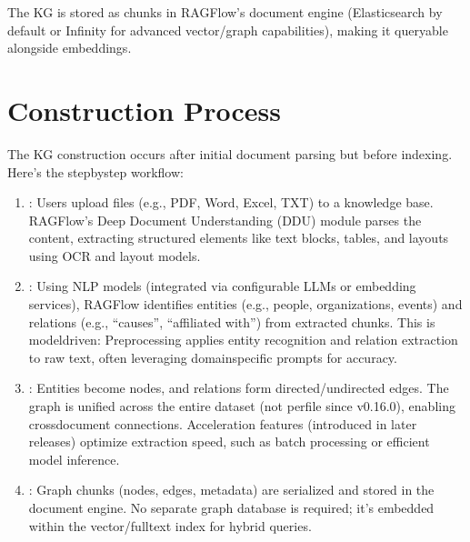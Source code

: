 \documentclass[letterpaper,10pt,english]{sphinxmanual}
\begin{document}
\sphinxAtStartPar
The KG is stored as chunks in RAGFlow’s document engine (Elasticsearch by default or Infinity for advanced vector/graph capabilities), making it queryable alongside embeddings.


\section{Construction Process}
\label{\detokenize{graph:construction-process}}
\sphinxAtStartPar
The KG construction occurs after initial document parsing but before indexing. Here’s the step\sphinxhyphen{}by\sphinxhyphen{}step workflow:
\begin{enumerate}
%
\item {} 
\sphinxAtStartPar
{}:
\sphinxhyphen{} Users upload files (e.g., PDF, Word, Excel, TXT) to a knowledge base.
\sphinxhyphen{} RAGFlow’s Deep Document Understanding (DDU) module parses the content, extracting structured elements like text blocks, tables, and layouts using OCR and layout models.

\item {} 
\sphinxAtStartPar
{}:
\sphinxhyphen{} Using NLP models (integrated via configurable LLMs or embedding services), RAGFlow identifies entities (e.g., people, organizations, events) and relations (e.g., “causes”, “affiliated with”) from extracted chunks.
\sphinxhyphen{} This is model\sphinxhyphen{}driven: Preprocessing applies entity recognition and relation extraction to raw text, often leveraging domain\sphinxhyphen{}specific prompts for accuracy.

\item {} 
\sphinxAtStartPar
{}:
\sphinxhyphen{} Entities become nodes, and relations form directed/undirected edges.
\sphinxhyphen{} The graph is unified across the entire dataset (not per\sphinxhyphen{}file since v0.16.0), enabling cross\sphinxhyphen{}document connections.
\sphinxhyphen{} Acceleration features (introduced in later releases) optimize extraction speed, such as batch processing or efficient model inference.

\item {} 
\sphinxAtStartPar
{}:
\sphinxhyphen{} Graph chunks (nodes, edges, metadata) are serialized and stored in the document engine.
\sphinxhyphen{} No separate graph database is required; it’s embedded within the vector/full\sphinxhyphen{}text index for hybrid queries.

\end{enumerate}
\end{document}
